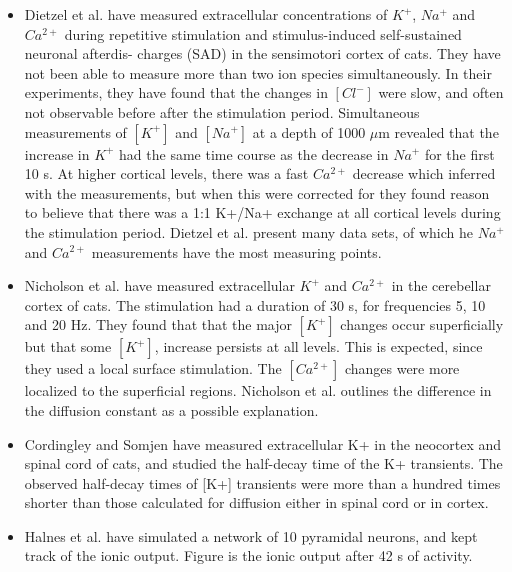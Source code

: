 \documentclass{article}
\begin{document}
\begin{itemize}
\item Dietzel et al. \cite{Dietzel1982} have measured extracellular concentrations of $K^+$, $Na^+$ and $Ca^{2+}$ during repetitive stimulation and stimulus-induced self-sustained neuronal afterdis-
charges (SAD) in the sensimotori cortex of cats. They have not been able to measure more than two ion species simultaneously. In their experiments, they have found that the changes in $[Cl^-]$ were slow, and often not observable before after the stimulation period. Simultaneous measurements of $[K^+]$ and $[Na^+]$ at a depth of 1000 $\mu$m revealed that the increase in $K^+$ had the same time course as the decrease in $Na^+$ for the first 10 s. At higher cortical levels, there was a fast $Ca^{2+}$ decrease which inferred with the measurements, but when this were corrected for they found reason to believe that there was a 1:1 K+/Na+ exchange at all cortical levels during the stimulation period. Dietzel et al. present many data sets, of which he $Na^+$ and $Ca^{2+}$ measurements have the most measuring points. 

\item Nicholson et al. \cite{Nicholson1987} have measured extracellular $K^+$ and $Ca^{2+}$ in the cerebellar cortex of cats. The stimulation had a duration of 30 s, for frequencies 5, 10 and 20 Hz. They found that that the major $[K^+]$ changes occur superficially but that some $[K^+]$, increase persists at all levels. This is expected, since they used a local surface stimulation. The $[Ca^{2+}]$ changes were more localized to the superficial regions. Nicholson et al. outlines the difference in the diffusion constant as a possible explanation.

\item Cordingley and Somjen \cite{CordingleySomjen} have measured extracellular K+ in the neocortex and spinal cord of cats, and studied the half-decay time of the K+ transients. The observed half-decay times of
[K+] transients were more than a hundred times shorter than those calculated for
diffusion either in spinal cord or in cortex. 

\item Halnes et al. \cite{Halnes2016} have simulated a network of 10 pyramidal neurons, and kept track of the ionic output. Figure is the ionic output after 42 s of activity. 
\end{itemize}
\end{document}
